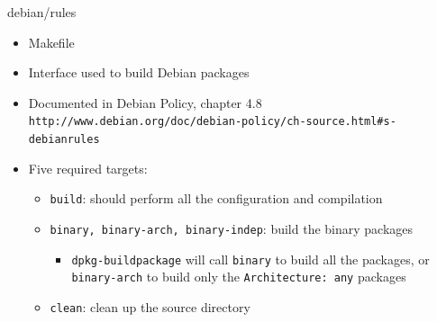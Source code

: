 \documentclass[10pt,final]{beamer}
\begin{document}
\begin{frame}[fragile]{debian/rules}
  \hbr
  \begin{itemize}
  \item Makefile
    \br
  \item Interface used to build Debian packages
    \br
  \item Documented in Debian Policy, chapter 4.8\\
    {\small \texttt{http://www.debian.org/doc/debian-policy/ch-source.html\#s-debianrules}}
    \br
  \item Five required targets:
    \begin{itemize}
    \item \texttt{build}: should perform all the configuration and compilation
      \hbr
    \item \texttt{binary, binary-arch, binary-indep}: build the binary packages
      \begin{itemize}
      \item \texttt{dpkg-buildpackage} will call \texttt{binary} to build all
        the packages, or \texttt{binary-arch} to build only the
        \texttt{Architecture:~any} packages
      \end{itemize}
      \hbr
    \item \texttt{clean}: clean up the source directory
    \end{itemize}
  \end{itemize}
\end{frame}
\end{document}

